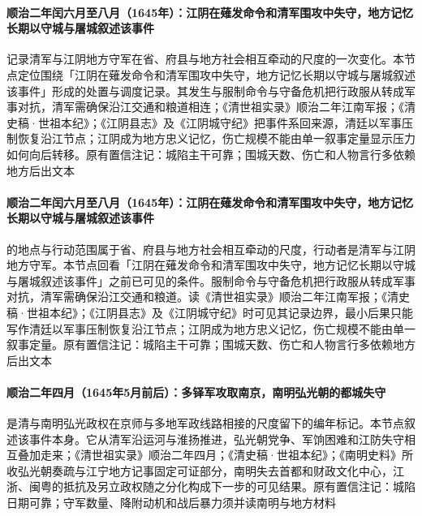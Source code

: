 \paragraph{顺治二年闰六月至八月（1645年）：江阴在薙发命令和清军围攻中失守，地方记忆长期以守城与屠城叙述该事件}
 记录清军与江阴地方守军在省、府县与地方社会相互牵动的尺度的一次变化。本节点定位围绕「江阴在薙发命令和清军围攻中失守，地方记忆长期以守城与屠城叙述该事件」形成的处置与调度记录。其发生与服制命令与守备危机把行政服从转成军事对抗，清军需确保沿江交通和粮道相连；《清世祖实录》顺治二年江南军报；《清史稿·世祖本纪》；《江阴县志》及《江阴城守纪》把事件系回来源，清廷以军事压制恢复沿江节点；江阴成为地方忠义记忆，伤亡规模不能由单一叙事定量显示压力如何向后转移。原有置信注记：城陷主干可靠；围城天数、伤亡和人物言行多依赖地方后出文本

\paragraph{顺治二年闰六月至八月（1645年）：江阴在薙发命令和清军围攻中失守，地方记忆长期以守城与屠城叙述该事件}
 的地点与行动范围属于省、府县与地方社会相互牵动的尺度，行动者是清军与江阴地方守军。本节点回看「江阴在薙发命令和清军围攻中失守，地方记忆长期以守城与屠城叙述该事件」之前已可见的条件。服制命令与守备危机把行政服从转成军事对抗，清军需确保沿江交通和粮道。读《清世祖实录》顺治二年江南军报；《清史稿·世祖本纪》；《江阴县志》及《江阴城守纪》时可见其记录边界，最小后果只能写作清廷以军事压制恢复沿江节点；江阴成为地方忠义记忆，伤亡规模不能由单一叙事定量。原有置信注记：城陷主干可靠；围城天数、伤亡和人物言行多依赖地方后出文本

\paragraph{顺治二年四月（1645年5月前后）：多铎军攻取南京，南明弘光朝的都城失守}
 是清与南明弘光政权在京师与多地军政线路相接的尺度留下的编年标记。本节点叙述该事件本身。它从清军沿运河与淮扬推进，弘光朝党争、军饷困难和江防失守相互叠加走来；《清世祖实录》顺治二年四月；《清史稿·世祖本纪》；《南明史料》所收弘光朝奏疏与江宁地方记事固定可证部分，南明失去首都和财政文化中心，江浙、闽粤的抵抗及另立政权随之分化构成下一步的可见结果。原有置信注记：城陷日期可靠；守军数量、降附动机和战后暴力须并读南明与地方材料

